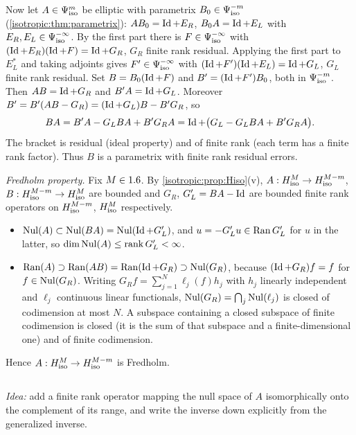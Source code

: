 Now let $A\in\Psi^{m}_{\mathrm{iso}}$ be elliptic with parametrix $B_0\in\Psi^{-m}_{\mathrm{iso}}$
(\cref{isotropic:thm:parametrix}): $AB_0=\operatorname{Id}+E_R$, $B_0A=\operatorname{Id}+E_L$ with
$E_R,E_L\in\Psi^{-\infty}_{\mathrm{iso}}$. By the first part there is $F\in\Psi^{-\infty}_{\mathrm{iso}}$ with
$(\operatorname{Id}+E_R)(\operatorname{Id}+F)=\operatorname{Id}+G_R$, $G_R$ finite rank residual. Applying the first part
to $E_L^*$ and taking adjoints gives $F'\in\Psi^{-\infty}_{\mathrm{iso}}$ with
$(\operatorname{Id}+F')(\operatorname{Id}+E_L)=\operatorname{Id}+G_L$, $G_L$ finite rank residual. Set
$B=B_0(\operatorname{Id}+F)$ and $B'=(\operatorname{Id}+F')B_0$, both in $\Psi^{-m}_{\mathrm{iso}}$. Then
$AB=\operatorname{Id}+G_R$ and $B'A=\operatorname{Id}+G_L$. Moreover
$B'=B'(AB-G_R)=(\operatorname{Id}+G_L)B-B'G_R$, so
\begin{equation*}
  BA=B'A-G_LBA+B'G_RA=\operatorname{Id}+\bigl(G_L-G_LBA+B'G_RA\bigr).
\end{equation*}
The bracket is residual (ideal property) and of finite rank (each term has
a finite rank factor). Thus $B$ is a parametrix with finite rank residual errors.

\emph{Fredholm property.} Fix $M\in1.6$. By \cref{isotropic:prop:Hiso}(v),
$A:H^{M}_{\mathrm{iso}}\to H^{M-m}_{\mathrm{iso}}$, $B:H^{M-m}_{\mathrm{iso}}\to H^{M}_{\mathrm{iso}}$ are bounded and $G_R$, $G_L'=BA-\operatorname{Id}$
are bounded finite rank operators on $H^{M-m}_{\mathrm{iso}}$, $H^{M}_{\mathrm{iso}}$ respectively.
\begin{itemize}
\item $\operatorname{Nul}(A)\subset\operatorname{Nul}(BA)=\operatorname{Nul}(\operatorname{Id}+G_L')$, and $u=-G_L'u\in\operatorname{Ran} G_L'$ for $u$ in
  the latter, so $\dim\operatorname{Nul}(A)\le\operatorname{rank}G_L'<\infty$.
\item $\operatorname{Ran}(A)\supset\operatorname{Ran}(AB)=\operatorname{Ran}(\operatorname{Id}+G_R)\supset\operatorname{Nul}(G_R)$, because
  $(\operatorname{Id}+G_R)f=f$ for $f\in\operatorname{Nul}(G_R)$. Writing $G_Rf=\sum_{j=1}^N\ell_j(f)h_j$
  with $h_j$ linearly independent and $\ell_j$ continuous linear functionals,
  $\operatorname{Nul}(G_R)=\bigcap_j\operatorname{Nul}(\ell_j)$ is closed of codimension at most $N$. A
  subspace containing a closed subspace of finite codimension is closed (it is
  the sum of that subspace and a finite-dimensional one) and of finite
  codimension.
\end{itemize}
Hence $A:H^{M}_{\mathrm{iso}}\to H^{M-m}_{\mathrm{iso}}$ is Fredholm.

\subsection*{}

\emph{Idea:} add a finite rank operator mapping the null space of $A$
isomorphically onto the complement of its range, and write the inverse down
explicitly from the generalized inverse.


